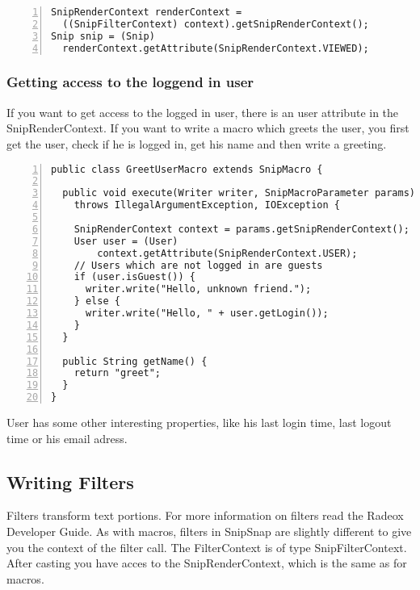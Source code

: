 \documentclass[a4paper,pdftex]{article}
\begin{document}
\begin{Verbatim}[gobble=0,frame=single,numbers=left,fontsize=\small]
SnipRenderContext renderContext =
  ((SnipFilterContext) context).getSnipRenderContext();
Snip snip = (Snip) 
  renderContext.getAttribute(SnipRenderContext.VIEWED);
\end{Verbatim}
    
\subsubsection{Getting access to the loggend in user}

If you want to get access to the logged in user, there is an user attribute
in the SnipRenderContext. If you want to write a macro which greets the user,
you first get the user, check if he is logged in, get his name and then write
a greeting.

\begin{Verbatim}[gobble=0,frame=single,numbers=left,fontsize=\small]
public class GreetUserMacro extends SnipMacro {

  public void execute(Writer writer, SnipMacroParameter params)
    throws IllegalArgumentException, IOException {

    SnipRenderContext context = params.getSnipRenderContext();
    User user = (User)
        context.getAttribute(SnipRenderContext.USER);
    // Users which are not logged in are guests
    if (user.isGuest()) {
      writer.write("Hello, unknown friend.");
    } else {
      writer.write("Hello, " + user.getLogin());
    }
  }

  public String getName() {
    return "greet";
  }
}
\end{Verbatim}

User has some other interesting properties, like his last login time, last logout time or
his email adress.


\subsection{Writing Filters}

Filters transform text portions. For more information on filters
read the Radeox Developer Guide\cite{RadeoxDeveloper}. As with macros,
filters in SnipSnap are slightly different to give you the context of the filter
call. The FilterContext  is of type SnipFilterContext.
After casting you have acces to the SnipRenderContext, which is the same
as for macros.
\end{document}

